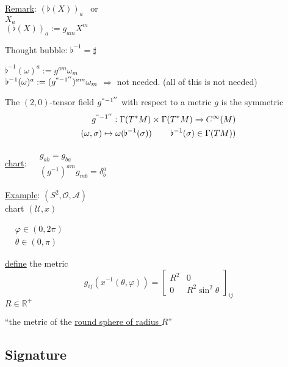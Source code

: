 \underline{Remark}: $(\flat(X))_a$ \quad \, or \\
$X_a$ \\
$(\flat(X))_a := g_{am} X^m$

Thought bubble: $\flat^{-1} = \sharp$

$\flat^{-1}(\omega)^a := g^{am}\omega_m$ \\
$\flat^{-1}(\omega)^a := (g^{``-1''})^{am}\omega_m$
$\Longrightarrow $ not needed.  (all of this is not needed)

\begin{definition}
  The $(2,0)$-tensor field $g^{``-1''}$ with respect to a metric $g$ is the symmetric
\[
\begin{aligned}
  g^{``-1''} : \Gamma(T^*M) \times \Gamma(T^*M) \xrightarrow{ ~ } C^{\infty}(M) \\
  (\omega, \sigma) \mapsto \omega( \flat^{-1}(\sigma)) \quad \quad \, \flat^{-1}(\sigma) \in \Gamma(TM))
\end{aligned}
\]

\underline{chart}: $\begin{aligned} & \quad \\ 
  & g_{ab} = g_{ba} \\
  & (g^{-1})^{am} g_{mb} = \delta^a_b \end{aligned}$


\end{definition}

\underline{Example}: $(S^2, \mathcal{O}, \mathcal{A})$ \\ 
\phantom{example } chart $(\mathcal{U}, x)$

$\begin{aligned} 
 & \varphi \in (0,2\pi ) \\ 
  & \theta \in (0,\pi)\end{aligned}$

\underline{define} the metric
\[
g_{ij}(x^{-1}(\theta,\varphi)) = \left[ \begin{matrix} R^2 & 0 \\
    0 & R^2\sin^2{\theta} \end{matrix} \right]_{ij}
\]
$R \in \mathbb{R}^+$

``the metric of the \underline{round sphere of radius $R$}''

\subsection{Signature} 

